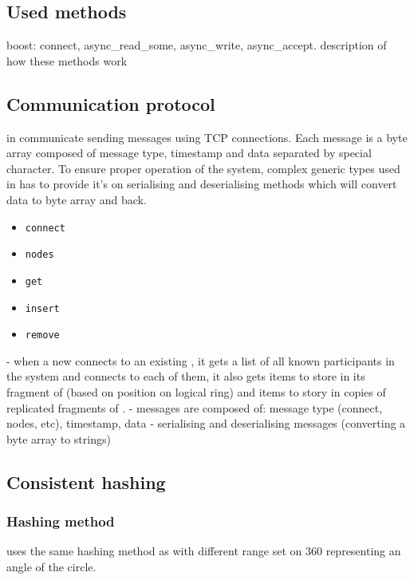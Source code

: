     \subsection{Used methods}
        boost: connect, async\_read\_some, async\_write, async\_accept.
        description of how these methods work
        
    \subsection{Communication protocol}
        \Nodes in \DHTS communicate sending messages using TCP connections. Each message is a byte array composed of message type, timestamp and data separated by special character. To ensure proper operation of the system, complex generic types used in \PHT has to provide it's on serialising and deserialising methods which will convert data to byte array and back.
        \begin{itemize}
            \item \texttt{connect}
            \item \texttt{nodes}
            \item \texttt{get}
            \item \texttt{insert}
            \item \texttt{remove}
        \end{itemize}
        
        - when a new \Node connects to an existing \Node, it gets a list of all known participants in the system and connects to each of them, it also gets items to store in its fragment of \PHT (based on position on logical ring) and items to story in copies of replicated fragments of \PHT.
        - messages are composed of: message type (connect, nodes, etc), timestamp, data
        - serialising and deserialising messages (converting a byte array to strings)
        
    \subsection{Consistent hashing}
        \subsubsection{Hashing method}
            \Node uses the same hashing method as \PHT with different range set on 360 representing an angle of the circle.
            
